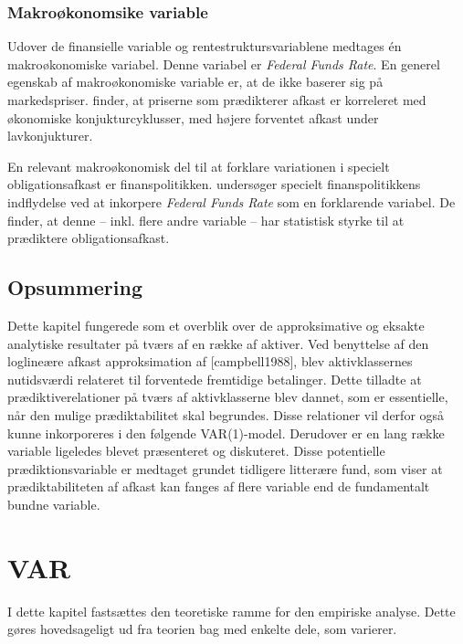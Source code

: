 \documentclass[
  a4paper,
  oneside]{memoir}
\begin{document}
\hypertarget{makrouxf8konomsike-variable}{%
\subsection{Makroøkonomsike variable}\label{makrouxf8konomsike-variable}}

Udover de finansielle variable og rentestruktursvariablene medtages én makroøkonomiske variabel. Denne variabel er \emph{Federal Funds Rate}. En generel egenskab af makroøkonomiske variable er, at de ikke baserer sig på markedspriser. \citep{Cochrane2008} finder, at priserne som prædikterer afkast er korreleret med økonomiske konjukturcyklusser, med højere forventet afkast under lavkonjukturer.

En relevant makroøkonomisk del til at forklare variationen i specielt obligationsafkast er finanspolitikken. \citep{Dai2005} undersøger specielt finanspolitikkens indflydelse ved at inkorpere \emph{Federal Funds Rate} som en forklarende variabel. De finder, at denne -- inkl. flere andre variable -- har statistisk styrke til at prædiktere obligationsafkast.

\hypertarget{opsummering}{%
\section{Opsummering}\label{opsummering}}

Dette kapitel fungerede som et overblik over de approksimative og eksakte analytiske resultater på tværs af en række af aktiver. Ved benyttelse af den loglineære afkast approksimation af {[}campbell1988{]}, blev aktivklassernes nutidsværdi relateret til forventede fremtidige betalinger. Dette tilladte at prædiktiverelationer på tværs af aktivklasserne blev dannet, som er essentielle, når den mulige prædiktabilitet skal begrundes. Disse relationer vil derfor også kunne inkorporeres i den følgende VAR(1)-model. Derudover er en lang række variable ligeledes blevet præsenteret og diskuteret. Disse potentielle prædiktionsvariable er medtaget grundet tidligere litterære fund, som viser at prædiktabiliteten af afkast kan fanges af flere variable end de fundamentalt bundne variable.

\hypertarget{varkapitel}{%
\chapter{VAR}\label{varkapitel}}

I dette kapitel fastsættes den teoretiske ramme for den empiriske analyse. Dette gøres hovedsageligt ud fra teorien bag \citep{Userguide2004} med enkelte dele, som varierer.
\end{document}
